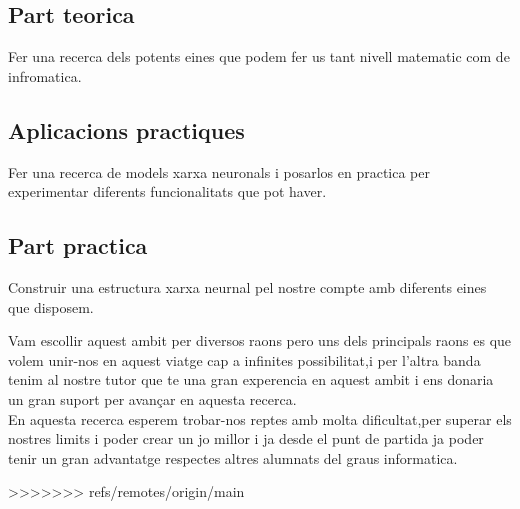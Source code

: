 \subsection{Part teorica}
Fer una recerca dels potents eines que podem fer us tant nivell matematic com de infromatica.
\subsection{Aplicacions practiques}
Fer una recerca de models xarxa neuronals i posarlos en practica per experimentar diferents funcionalitats que pot haver.
\subsection{Part practica }
Construir una estructura xarxa neurnal pel nostre compte amb diferents eines que disposem.

Vam escollir aquest ambit per diversos raons pero uns dels principals raons es que volem unir-nos en aquest viatge cap  a infinites possibilitat,i per l'altra banda tenim al nostre tutor que te una gran experencia en aquest ambit i ens donaria un gran suport per avançar en aquesta recerca.\\
En aquesta recerca esperem trobar-nos reptes amb molta dificultat,per superar els nostres limits i poder crear un jo millor i ja desde el punt de partida ja poder tenir un gran advantatge respectes altres alumnats del graus informatica.

















>>>>>>> refs/remotes/origin/main

